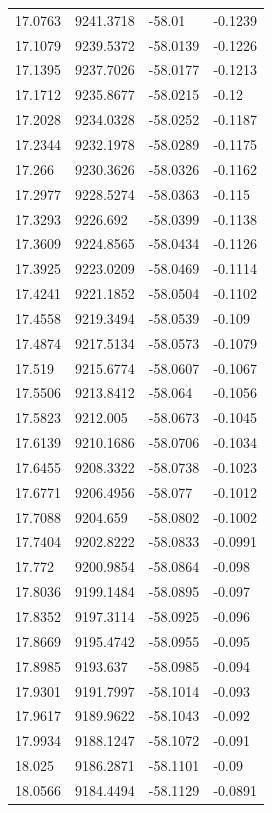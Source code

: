 \begin{table}[H]
\begin{tabular}{llll}
17.0763 & 9241.3718 & -58.01 & -0.1239 \\
17.1079 & 9239.5372 & -58.0139 & -0.1226 \\
17.1395 & 9237.7026 & -58.0177 & -0.1213 \\
17.1712 & 9235.8677 & -58.0215 & -0.12 \\
17.2028 & 9234.0328 & -58.0252 & -0.1187 \\
17.2344 & 9232.1978 & -58.0289 & -0.1175 \\
17.266 & 9230.3626 & -58.0326 & -0.1162 \\
17.2977 & 9228.5274 & -58.0363 & -0.115 \\
17.3293 & 9226.692 & -58.0399 & -0.1138 \\
17.3609 & 9224.8565 & -58.0434 & -0.1126 \\
17.3925 & 9223.0209 & -58.0469 & -0.1114 \\
17.4241 & 9221.1852 & -58.0504 & -0.1102 \\
17.4558 & 9219.3494 & -58.0539 & -0.109 \\
17.4874 & 9217.5134 & -58.0573 & -0.1079 \\
17.519 & 9215.6774 & -58.0607 & -0.1067 \\
17.5506 & 9213.8412 & -58.064 & -0.1056 \\
17.5823 & 9212.005 & -58.0673 & -0.1045 \\
17.6139 & 9210.1686 & -58.0706 & -0.1034 \\
17.6455 & 9208.3322 & -58.0738 & -0.1023 \\
17.6771 & 9206.4956 & -58.077 & -0.1012 \\
17.7088 & 9204.659 & -58.0802 & -0.1002 \\
17.7404 & 9202.8222 & -58.0833 & -0.0991 \\
17.772 & 9200.9854 & -58.0864 & -0.098 \\
17.8036 & 9199.1484 & -58.0895 & -0.097 \\
17.8352 & 9197.3114 & -58.0925 & -0.096 \\
17.8669 & 9195.4742 & -58.0955 & -0.095 \\
17.8985 & 9193.637 & -58.0985 & -0.094 \\
17.9301 & 9191.7997 & -58.1014 & -0.093 \\
17.9617 & 9189.9622 & -58.1043 & -0.092 \\
17.9934 & 9188.1247 & -58.1072 & -0.091 \\
18.025 & 9186.2871 & -58.1101 & -0.09 \\
18.0566 & 9184.4494 & -58.1129 & -0.0891 \\

\end{tabular}
\end{table}
